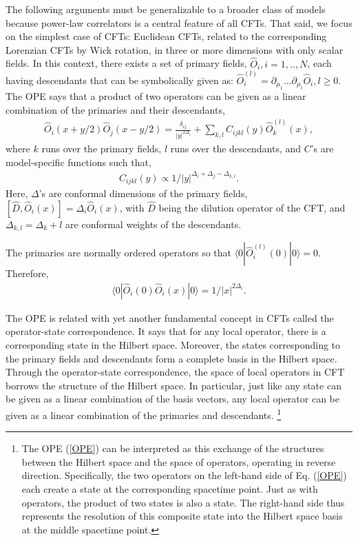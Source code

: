 \documentclass[final,5p,10pt,times,twocolumn,year]{elsarticle}
\begin{document}
The following arguments must be generalizable to a broader class of models because power-law correlators is a central feature of all CFTs. That said, we focus on the simplest case of CFTs: Euclidean CFTs, related to the corresponding Lorenzian CFTs by Wick rotation, in three or more dimensions with only scalar fields. In this context, there exists a set of primary fields, $\hat O_i, i=1,..,N$, each having descendants that can be symbolically given as: $\hat O_{i}^{(l)} = \partial_{\mu_1}...\partial_{\mu_l}\hat O_i, l\ge0$. The OPE says that a product of two operators can be given as a linear combination of the primaries and their descendants,
\begin{eqnarray}
    \hat{O}_i(x+y/2) \hat O_j (x-y/2) %
    =\frac{\delta_{ij}}{|y|^{2\Delta_i}} + \sum\nolimits_{k,l}C_{ijkl}(y)\hat O_{k}^{(l)}(x),\label{OPE}
\end{eqnarray}
where $k$ runs over the primary fields, $l$ runs over the descendants, and $C$'s are model-specific functions such that,
\begin{eqnarray}
C_{ijkl}(y) \propto 1/|y|^{\Delta_i+\Delta_j-\Delta_{k,l}}.\label{OPE_2}
\end{eqnarray}
Here, $\Delta$'s are conformal dimensions of the primary fields, $[\hat D, \hat O_i(x)] = \Delta_i \hat O_i(x)$, with $\hat D$ being the dilution operator of the CFT, and $\Delta_{k,l}=\Delta_k + l$ are conformal weights of the descendants.

The primaries are normally ordered operators so that $\langle0| \hat O_i^{(l)}(0) |0\rangle = 0$. Therefore,
\begin{eqnarray}
    \langle 0 | \hat O_i(0)\hat O_i(x)| 0 \rangle =1/|x|^{2\Delta_i}.
\end{eqnarray} 

The OPE is related with yet another fundamental concept in CFTs called the operator-state correspondence. It says that for any local operator, there is a corresponding state in the Hilbert space. Moreover, the states corresponding to the primary fields and descendants form a complete basis in the Hilbert space. Through the operator-state correspondence, the space of local operators in CFT borrows the structure of the Hilbert space. In particular, just like any state can be given as a linear combination of the basis vectors, any local operator can be given as a linear combination of the primaries and descendants.
\footnote{The OPE (\ref{OPE}) can be interpreted as this exchange of the structures between the Hilbert space and the space of operators, operating in reverse direction. Specifically, the two operators on the left-hand side of Eq. (\ref{OPE}) each create a state at the corresponding spacetime point. Just as with operators, the product of two states is also a state. The right-hand side thus represents the resolution of this composite state into the Hilbert space basis at the middle spacetime point.}
\end{document}
